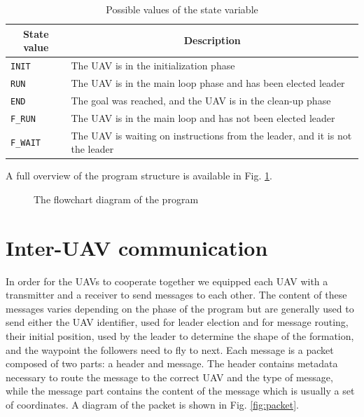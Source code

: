 \begin{table}
	\caption{Possible values of the state variable}\label{tab:states}
	\begin{center}
		\begin{tabular}[t]{l|l}
			\hline
			\multicolumn{1}{c|}{\textbf{State value}} & 
			\multicolumn{1}{c}{\textbf{Description}} \\
			\hline 
			\texttt{INIT} & The UAV is in the initialization phase \\
			\hline
			\texttt{RUN} & The UAV is in the main loop phase and has been elected leader \\
			\hline
			\texttt{END} & The goal was reached, and the UAV is in the clean-up phase \\
			\hline
			\texttt{F\_RUN} & The UAV is in the main loop and has not been elected leader \\
			\hline
			\texttt{F\_WAIT} & The UAV is waiting on instructions from the leader, and it is not the leader \\
			\hline
		\end{tabular}
	\end{center}
\end{table}

A full overview of the program structure is available in Fig. \ref{fig:flowchart}.

\begin{figure}
	\begin{center}
		
	\end{center}
	\caption{The flowchart diagram of the program}\label{fig:flowchart}
\end{figure}

\section{Inter-UAV communication}

In order for the UAVs to cooperate together we equipped each UAV with a transmitter and a 
receiver to send messages to each other. The content of these messages varies depending
on the phase of the program but are generally used to send either the UAV identifier, used
for leader election and for message routing, their initial position, used by the leader
to determine the shape of the formation, and the waypoint the followers need to fly to next. 
Each message is a packet composed of two parts: a header and message. The header contains
metadata necessary to route the message to the correct UAV and the type of message, while 
the message part contains the content of the message which is usually a set of coordinates. 
A diagram of the packet is shown in Fig. \ref{fig:packet}.

